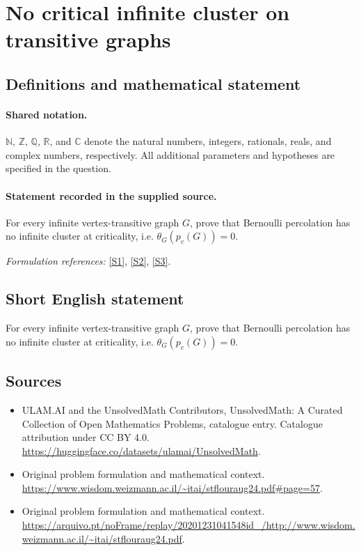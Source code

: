 \documentclass[11pt]{article}
\newcommand{\sref}[2]{\hyperlink{source:#1:#2}{[S#2]}}
\begin{document}
\section{No critical infinite cluster on transitive graphs}\label{statement}

\subsection{Definitions and mathematical statement}

\paragraph{Shared notation.}$\mathbb N$, $\mathbb Z$, $\mathbb Q$, $\mathbb R$, and $\mathbb C$ denote the natural numbers, integers, rationals, reals, and complex numbers, respectively. All additional parameters and hypotheses are specified in the question.


\paragraph{Statement recorded in the supplied source.}
For every infinite vertex-transitive graph $G$, prove that Bernoulli percolation has no infinite cluster at criticality, i.e. $\theta_G(p_c(G))=0$.
\par\smallskip\textit{Formulation references:} \sref{statement}{1}, \sref{statement}{2}, \sref{statement}{3}.
\subsection{Short English statement}
For every infinite vertex-transitive graph $G$, prove that Bernoulli percolation has no infinite cluster at criticality, i.e. $\theta_G(p_c(G))=0$.
\subsection{Sources}
\begin{itemize}
\item[\hypertarget{source:statement:1}{S1}] ULAM.AI and the UnsolvedMath Contributors, UnsolvedMath: A Curated Collection of Open Mathematics Problems, catalogue entry. Catalogue attribution under CC BY 4.0.
\url{https://huggingface.co/datasets/ulamai/UnsolvedMath}.
\item[\hypertarget{source:statement:2}{S2}] Original problem formulation and mathematical context.
\url{https://www.wisdom.weizmann.ac.il/~itai/stflouraug24.pdf#page=57}.
\item[\hypertarget{source:statement:3}{S3}] Original problem formulation and mathematical context.
\url{https://arquivo.pt/noFrame/replay/20201231041548id_/http://www.wisdom.weizmann.ac.il/~itai/stflouraug24.pdf}.
\end{itemize}
\label{end:statement}
\end{document}
